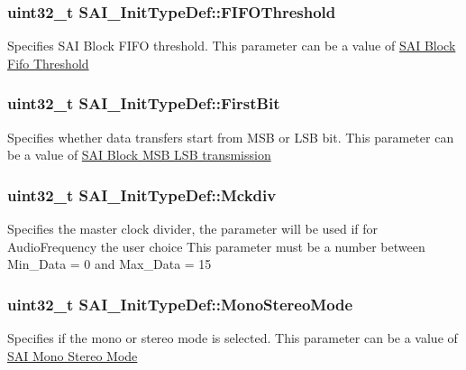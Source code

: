 \subsubsection[{\texorpdfstring{F\+I\+F\+O\+Threshold}{FIFOThreshold}}]{\setlength{\rightskip}{0pt plus 5cm}uint32\+\_\+t S\+A\+I\+\_\+\+Init\+Type\+Def\+::\+F\+I\+F\+O\+Threshold}\hypertarget{struct_s_a_i___init_type_def_a7b47337f427e59c2d894937b174d7b06}{}\label{struct_s_a_i___init_type_def_a7b47337f427e59c2d894937b174d7b06}
Specifies S\+AI Block F\+I\+FO threshold. This parameter can be a value of \hyperlink{group___s_a_i___block___fifo___threshold}{S\+AI Block Fifo Threshold} 
\subsubsection[{\texorpdfstring{First\+Bit}{FirstBit}}]{\setlength{\rightskip}{0pt plus 5cm}uint32\+\_\+t S\+A\+I\+\_\+\+Init\+Type\+Def\+::\+First\+Bit}\hypertarget{struct_s_a_i___init_type_def_a7683663e2a24126a30d15f1905b2b0ad}{}\label{struct_s_a_i___init_type_def_a7683663e2a24126a30d15f1905b2b0ad}
Specifies whether data transfers start from M\+SB or L\+SB bit. This parameter can be a value of \hyperlink{group___s_a_i___block___m_s_b___l_s_b__transmission}{S\+AI Block M\+SB L\+SB transmission} 
\subsubsection[{\texorpdfstring{Mckdiv}{Mckdiv}}]{\setlength{\rightskip}{0pt plus 5cm}uint32\+\_\+t S\+A\+I\+\_\+\+Init\+Type\+Def\+::\+Mckdiv}\hypertarget{struct_s_a_i___init_type_def_a047c3af1ce0bf02723350361c010db26}{}\label{struct_s_a_i___init_type_def_a047c3af1ce0bf02723350361c010db26}
Specifies the master clock divider, the parameter will be used if for Audio\+Frequency the user choice This parameter must be a number between Min\+\_\+\+Data = 0 and Max\+\_\+\+Data = 15 
\subsubsection[{\texorpdfstring{Mono\+Stereo\+Mode}{MonoStereoMode}}]{\setlength{\rightskip}{0pt plus 5cm}uint32\+\_\+t S\+A\+I\+\_\+\+Init\+Type\+Def\+::\+Mono\+Stereo\+Mode}\hypertarget{struct_s_a_i___init_type_def_a69a9d95ec5d511f60e3006bfba486bad}{}\label{struct_s_a_i___init_type_def_a69a9d95ec5d511f60e3006bfba486bad}
Specifies if the mono or stereo mode is selected. This parameter can be a value of \hyperlink{group___s_a_i___mono___stereo___mode}{S\+AI Mono Stereo Mode} 
